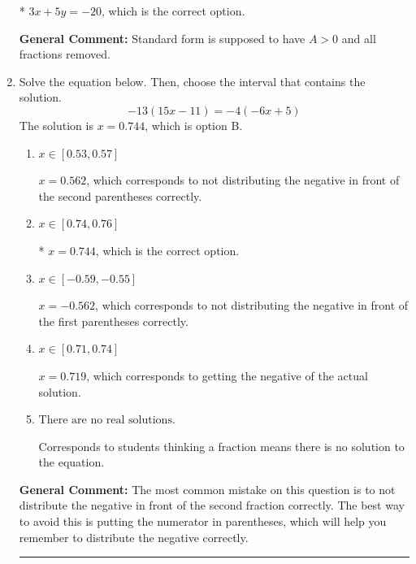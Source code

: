 \documentclass{extbook}[14pt]
\newcommand{\litem}[1]{\item #1

\rule{\textwidth}{0.4pt}}
\begin{document}
\begin{enumerate}
{\begin{enumerate}[label=\Alph*.]
* $3x + 5y = -20$, which is the correct option.
\end{enumerate}

\textbf{General Comment:} Standard form is supposed to have $A > 0$ and all fractions removed.
}
\litem{
Solve the equation below. Then, choose the interval that contains the solution.
\[ -13(15x -11) = -4(-6x + 5) \]The solution is \( x = 0.744 \), which is option B.\begin{enumerate}[label=\Alph*.]
\item \( x \in [0.53, 0.57] \)

$x = 0.562$, which corresponds to not distributing the negative in front of the second parentheses correctly.
\item \( x \in [0.74, 0.76] \)

* $x = 0.744$, which is the correct option.
\item \( x \in [-0.59, -0.55] \)

$x = -0.562$, which corresponds to not distributing the negative in front of the first parentheses correctly.
\item \( x \in [0.71, 0.74] \)

$x = 0.719$, which corresponds to getting the negative of the actual solution.
\item \( \text{There are no real solutions.} \)

Corresponds to students thinking a fraction means there is no solution to the equation.
\end{enumerate}

\textbf{General Comment:} The most common mistake on this question is to not distribute the negative in front of the second fraction correctly. The best way to avoid this is putting the numerator in parentheses, which will help you remember to distribute the negative correctly.
}
\end{enumerate}
\end{document}
